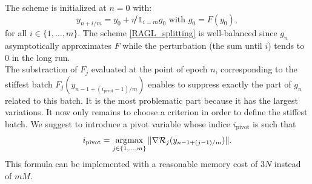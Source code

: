 \documentclass[article,authoryear,jmlmc]{beg_32}             %
\begin{document}
The scheme is initialized at $n=0$ with:
\begin{equation*}
	y_{n+i/m} = y_0 + \eta^i \mathds{1}_{i=m} g_0 \text{ with } g_0 = F(y_0),
\end{equation*}
for all $i \in \{1,\dots,m\}$. 
The scheme \eqref{RAGL_splitting} is well-balanced since $g_n$ asymptotically approximates $F$ while the perturbation (the sum until $i$) tends to 0 in the long run. \\
{The substraction of $F_j$ evaluated at the point of epoch $n$, corresponding to the stiffest batch $F_j\left(y_{n-1+(i_{\text{pivot}}-1)/m}\right)$ enables to suppress exactly the
part of $g_n$ related to this batch. It is the most problematic part because it has the largest variations. It now only remains to choose a criterion in order to define the
stiffest batch. We suggest to introduce a pivot variable whose indice  $i_{\text{pivot}}$ is such that
$$i_{\text{pivot}} = \operatorname*{\arg\!\textrm{max}}_{j\in\{1,...,m\}} \|\nabla \mathcal{R}_j(y_{n-1+(j-1)/m})\|.$$}
This formula can be implemented with a reasonable memory cost of $3N$ instead of $mM$.


\subsection{}
\label{th_prop}
\end{document}
